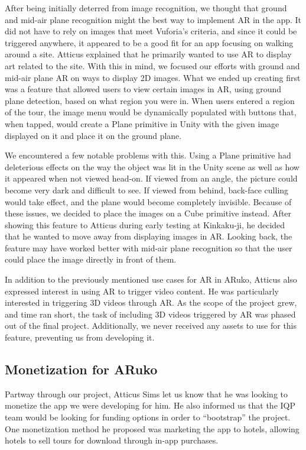 \documentclass[a4paper, 10pt, american, titlepage]{article}
\begin{document}
After being initially deterred from image recognition, we thought that ground
and mid-air plane recognition might the best way to implement AR in the app. It
did not have to rely on images that meet Vuforia's criteria, and since it could
be triggered anywhere, it appeared to be a good fit for an app focusing on
walking around a site. Atticus explained that he primarily wanted to use AR to
display art related to the site. With this in mind, we focused our efforts with
ground and mid-air plane AR on ways to display 2D images. What we ended up
creating first was a feature that allowed users to view certain images in AR,
using ground plane detection, based on what region you were in. When users
entered a region of the tour, the image menu would be dynamically populated with
buttons that, when tapped, would create a Plane primitive in Unity with the
given image displayed on it and place it on the ground plane. 

We encountered a few notable problems with this. Using a Plane primitive had
deleterious effects on the way the object was lit in the Unity scene as well as
how it appeared when not viewed head-on. If viewed from an angle, the picture
could become very dark and difficult to see. If viewed from behind, back-face
culling would take effect, and the plane would become completely invisible.
Because of these issues, we decided to place the images on a Cube primitive
instead. After showing this feature to Atticus during early testing at
Kinkaku-ji, he decided that he wanted to move away from displaying images in AR.
Looking back, the feature may have worked better with mid-air plane recognition
so that the user could place the image directly in front of them. 

In addition to the previously mentioned use cases for AR in ARuko, Atticus also
expressed interest in using AR to trigger video content. He was particularly
interested in triggering 3D videos through AR. As the scope of the project grew,
and time ran short, the task of including 3D videos triggered by AR was phased
out of the final project. Additionally, we never received any assets to use for
this feature, preventing us from developing it.

\subsection{Monetization for ARuko}
\label{sec:monetizationForAruko}

Partway through our project, Atticus Sims let us know that he was looking to
monetize the app we were developing for him. He also informed us that the IQP
team would be looking for funding options in order to ``bootstrap'' the project.
One monetization method he proposed was marketing the app to hotels,
allowing hotels to sell tours for download through in-app purchases.
\end{document}
